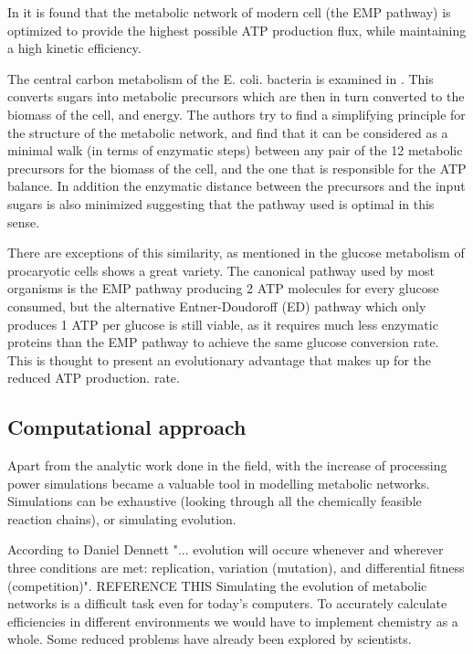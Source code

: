 \documentclass[10pt,a4paper]{article}
\begin{document}
	In \cite{theoretical} it is found that the metabolic network of modern cell (the EMP pathway) is optimized to provide the highest possible ATP production flux, while maintaining a high kinetic efficiency. 
	
	The central carbon metabolism of the E. coli. bacteria is examined in \cite{central}. This converts sugars into metabolic precursors which are then in turn converted to the biomass of the cell, and energy. The authors try to find a simplifying principle for the structure of the metabolic network, and find that it can be considered as a minimal walk (in terms of enzymatic steps) between any pair of the 12 metabolic precursors for the biomass of the cell, and the one that is responsible for the ATP balance. In addition the enzymatic distance between the precursors and the input sugars is also minimized suggesting that the pathway used is optimal in this sense. 
	
	There are exceptions of this similarity, as mentioned in \cite{strategy} the glucose metabolism of procaryotic cells shows a great variety. The canonical pathway used by most organisms is the EMP pathway producing 2 ATP molecules for every glucose consumed, but the alternative Entner-Doudoroff (ED) pathway which only produces 1 ATP per glucose is still viable, as it requires much less enzymatic proteins than the EMP pathway to achieve the same glucose conversion rate. This is thought to present an evolutionary advantage that makes up for the reduced ATP production. rate. 
	
	\subsection{Computational approach}
	
	Apart from the analytic work done in the field, with the increase of processing power simulations became a valuable tool in modelling metabolic networks. Simulations can be exhaustive (looking through all the chemically feasible reaction chains), or simulating evolution. 
	
	According to Daniel Dennett "... evolution will occure whenever and wherever three conditions are met: replication, variation (mutation), and differential fitness (competition)". REFERENCE THIS 
	Simulating the evolution of metabolic networks is a difficult task even for today's computers. To accurately calculate efficiencies in different environments we would have to implement chemistry as a whole. Some reduced problems have already been explored by scientists. 
	
\end{document}
